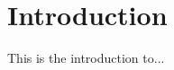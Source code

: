\chapter{Introduction}
\label{chapter:introduction}

This is the introduction to...

\nocite{berge_iscas07}

